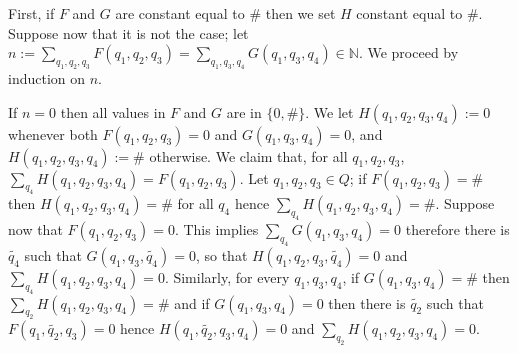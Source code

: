 \documentclass[10pt,a4paper]{article}
\let\mathbb\mathds
\newcommand{\nats}{\mathbb{N}}
\newcommand{\set}[1]{\{#1\}}
\newcommand{\deff}{:=}
\newcommand*{\states}{Q}
\newcommand*{\dummysymb}{\#}
\begin{document}
\begin{appendixproof}
	First, if \(F\) and \(G\) are constant equal to \(\dummysymb\) then we set \(H\) constant equal to \(\dummysymb\).
	Suppose now that it is not the case; let \(n \deff \sum_{q_1,q_2,q_3} F(q_1,q_2,q_3) = \sum_{q_1,q_3,q_4} G(q_1,q_3,q_4) \in \nats\).
	We proceed by induction on \(n\).

	If \(n=0\) then all values in \(F\) and \(G\) are in \(\set{0,\dummysymb}\).
	We let \(H(q_1,q_2,q_3,q_4) \deff 0\) whenever both \(F(q_1,q_2,q_3) =0\) and \(G(q_1,q_3,q_4) =0\), and \(H(q_1,q_2,q_3,q_4) \deff \dummysymb\) otherwise.
	We claim that, for all \(q_1,q_2,q_3\), \(\sum_{q_4} H(q_1,q_2,q_3,q_4) = F(q_1,q_2,q_3)\).
	Let \(q_1,q_2,q_3 \in \states\); if \(F(q_1,q_2,q_3) = \dummysymb\) then \(H(q_1,q_2,q_3,q_4) = \dummysymb\) for all \(q_4\) hence \(\sum_{q_4} H(q_1,q_2,q_3,q_4) = \dummysymb\).
	Suppose now that \(F(q_1,q_2,q_3) = 0\).
	This implies \(\sum_{q_4} G(q_1,q_3,q_4) = 0\) therefore there is \(\tilde{q_4}\) such that \(G(q_1,q_3,\tilde{q_4}) =0\), so that \(H(q_1,q_2,q_3,\tilde{q_4})=0\) and \(\sum_{q_4} H(q_1,q_2,q_3,q_4) = 0\).
	Similarly, for every \(q_1,q_3,q_4\), if \(G(q_1,q_3,q_4) = \dummysymb\) then \(\sum_{q_2} H(q_1,q_2,q_3,q_4) = \dummysymb\) and if \(G(q_1,q_3,q_4) = 0\) then there is \(\tilde{q_2}\) such that \(F(q_1,\tilde{q_2},q_3) =0\) hence \(H(q_1,\tilde{q_2},q_3,q_4) =0\) and \(\sum_{q_2} H(q_1,q_2,q_3,q_4) =0\).


\end{appendixproof}
\end{document}
